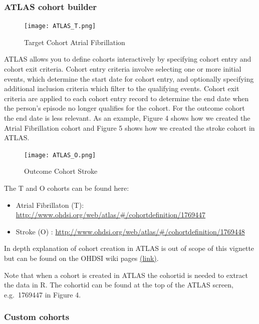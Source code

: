 \documentclass[]{article}
\providecommand{\tightlist}{%
  \setlength{\itemsep}{0pt}\setlength{\parskip}{0pt}}
\begin{document}
\subsubsection{ATLAS cohort builder}\label{atlas-cohort-builder}

\begin{figure}
\centering
\texttt{[image: ATLAS\_T.png]}
\caption{Target Cohort Atrial Fibrillation}
\end{figure}

ATLAS allows you to define cohorts interactively by specifying cohort
entry and cohort exit criteria. Cohort entry criteria involve selecting
one or more initial events, which determine the start date for cohort
entry, and optionally specifying additional inclusion criteria which
filter to the qualifying events. Cohort exit criteria are applied to
each cohort entry record to determine the end date when the person's
episode no longer qualifies for the cohort. For the outcome cohort the
end date is less relevant. As an example, Figure 4 shows how we created
the Atrial Fibrillation cohort and Figure 5 shows how we created the
stroke cohort in ATLAS.

\begin{figure}
\centering
\texttt{[image: ATLAS\_O.png]}
\caption{Outcome Cohort Stroke}
\end{figure}

The T and O cohorts can be found here:

\begin{itemize}
\tightlist
\item
  Atrial Fibrillaton (T):
  \url{http://www.ohdsi.org/web/atlas/\#/cohortdefinition/1769447}
\item
  Stroke (O) :
  \url{http://www.ohdsi.org/web/atlas/\#/cohortdefinition/1769448}
\end{itemize}

In depth explanation of cohort creation in ATLAS is out of scope of this
vignette but can be found on the OHDSI wiki pages
\href{http://www.ohdsi.org/web/wiki/doku.php?id=documentation:software:atlas}{(link)}.

Note that when a cohort is created in ATLAS the cohortid is needed to
extract the data in R. The cohortid can be found at the top of the ATLAS
screen, e.g.~1769447 in Figure 4.

\subsubsection{Custom cohorts}\label{custom-cohorts}
\end{document}
